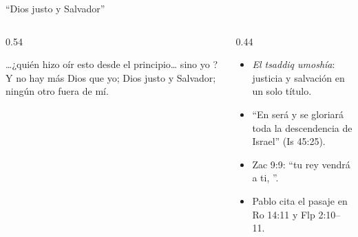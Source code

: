 \begin{frame}{``Dios justo y Salvador''}
\begin{columns}[c,onlytextwidth]
\begin{column}{0.54\textwidth}
\begin{cita}\ldots{}¿quién hizo oír esto desde el principio\ldots{} sino yo \SENOR? Y no hay más Dios que yo; Dios justo y Salvador; ningún otro fuera de mí.\end{cita}
\begin{center}\end{center}
\end{column}
\begin{column}{0.44\textwidth}\small
\begin{itemize}
\item \emph{El tsaddiq umoshía}: justicia y salvación en un solo título.
\item ``En \SENOR{} será  y se gloriará toda la descendencia de Israel'' (Is 45:25).
\item Zac 9:9: ``tu rey vendrá a ti, ''.
\item Pablo cita el pasaje en Ro 14:11 y Flp 2:10--11.
\end{itemize}
\end{column}
\end{columns}
\end{frame}

